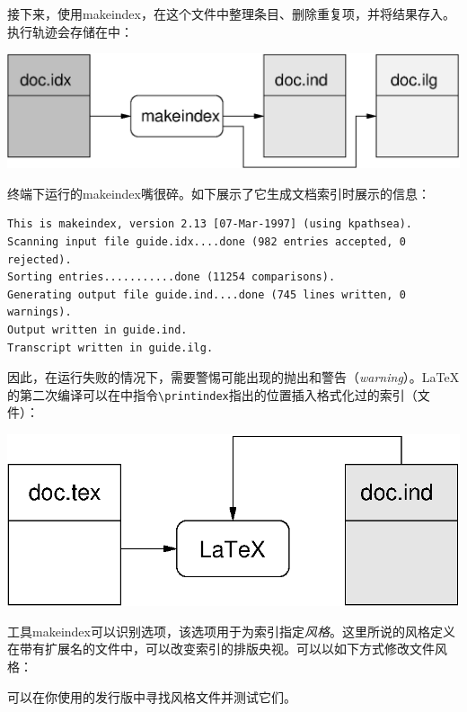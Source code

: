 接下来，使用\textsf{makeindex}，在这个文件中整理条目、删除重复项，并将结果存入。执行轨迹会存储在中：

\begin{center}
    \includegraphics{img/makeindex2}
\end{center}

终端下运行的\textsf{makeindex}嘴很碎。如下展示了它生成文档索引时展示的信息：

\begin{dmd}
\begin{verbatim}
This is makeindex, version 2.13 [07-Mar-1997] (using kpathsea).
Scanning input file guide.idx....done (982 entries accepted, 0 rejected).
Sorting entries...........done (11254 comparisons).
Generating output file guide.ind....done (745 lines written, 0 warnings).
Output written in guide.ind.
Transcript written in guide.ilg.
\end{verbatim}
\end{dmd}

因此，在运行失败的情况下，需要警惕可能出现的抛出和警告（\emph{warning}）。\LaTeX 的第二次编译可以在中指令\verb|\printindex|指出的位置插入格式化过的索引（文件）：

\begin{center}
    \includegraphics{img/makeindex3}
\end{center}

\begin{ii}
工具makeindex可以识别选项，该选项用于为索引指定\emph{风格}。这里所说的风格定义在带有扩展名的文件中，可以改变索引的排版央视。可以以如下方式修改文件风格：


可以在你使用的发行版中寻找风格文件并测试它们。
\end{ii}

